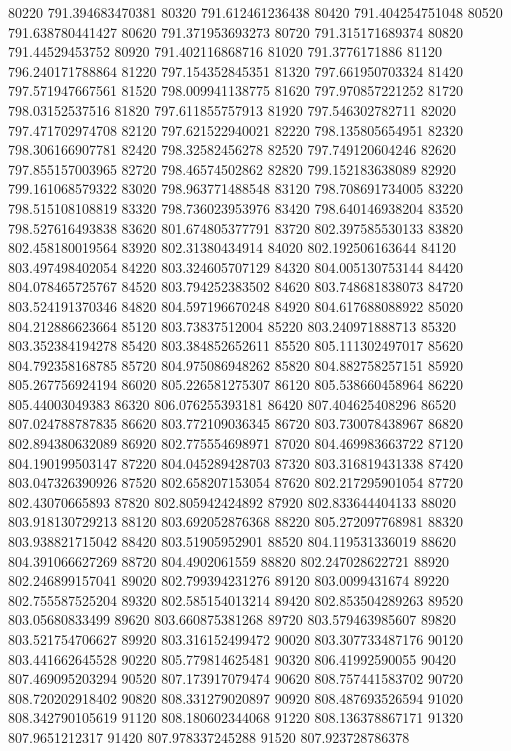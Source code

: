 {80220 791.394683470381
80320 791.612461236438
80420 791.404254751048
80520 791.638780441427
80620 791.371953693273
80720 791.315171689374
80820 791.44529453752
80920 791.402116868716
81020 791.3776171886
81120 796.240171788864
81220 797.154352845351
81320 797.661950703324
81420 797.571947667561
81520 798.009941138775
81620 797.970857221252
81720 798.03152537516
81820 797.611855757913
81920 797.546302782711
82020 797.471702974708
82120 797.621522940021
82220 798.135805654951
82320 798.306166907781
82420 798.32582456278
82520 797.749120604246
82620 797.855157003965
82720 798.46574502862
82820 799.152183638089
82920 799.161068579322
83020 798.963771488548
83120 798.708691734005
83220 798.515108108819
83320 798.736023953976
83420 798.640146938204
83520 798.527616493838
83620 801.674805377791
83720 802.397585530133
83820 802.458180019564
83920 802.31380434914
84020 802.192506163644
84120 803.497498402054
84220 803.324605707129
84320 804.005130753144
84420 804.078465725767
84520 803.794252383502
84620 803.748681838073
84720 803.524191370346
84820 804.597196670248
84920 804.617688088922
85020 804.212886623664
85120 803.73837512004
85220 803.240971888713
85320 803.352384194278
85420 803.384852652611
85520 805.111302497017
85620 804.792358168785
85720 804.975086948262
85820 804.882758257151
85920 805.267756924194
86020 805.226581275307
86120 805.538660458964
86220 805.44003049383
86320 806.076255393181
86420 807.404625408296
86520 807.024788787835
86620 803.772109036345
86720 803.730078438967
86820 802.894380632089
86920 802.775554698971
87020 804.469983663722
87120 804.190199503147
87220 804.045289428703
87320 803.316819431338
87420 803.047326390926
87520 802.658207153054
87620 802.217295901054
87720 802.43070665893
87820 802.805942424892
87920 802.833644404133
88020 803.918130729213
88120 803.692052876368
88220 805.272097768981
88320 803.938821715042
88420 803.51905952901
88520 804.119531336019
88620 804.391066627269
88720 804.4902061559
88820 802.247028622721
88920 802.246899157041
89020 802.799394231276
89120 803.0099431674
89220 802.755587525204
89320 802.585154013214
89420 802.853504289263
89520 803.05680833499
89620 803.660875381268
89720 803.579463985607
89820 803.521754706627
89920 803.316152499472
90020 803.307733487176
90120 803.441662645528
90220 805.779814625481
90320 806.41992590055
90420 807.469095203294
90520 807.173917079474
90620 808.757441583702
90720 808.720202918402
90820 808.331279020897
90920 808.487693526594
91020 808.342790105619
91120 808.180602344068
91220 808.136378867171
91320 807.9651212317
91420 807.978337245288
91520 807.923728786378
}
